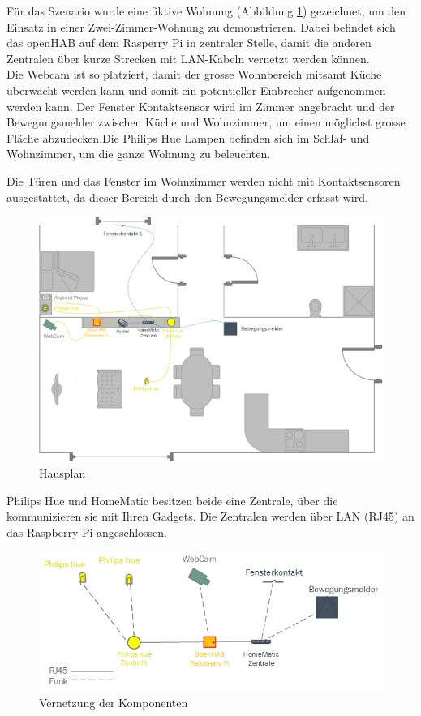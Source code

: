 Für das Szenario wurde eine fiktive Wohnung (Abbildung \ref{fig:housePlan}) gezeichnet, um den Einsatz in einer Zwei-Zimmer-Wohnung zu demonstrieren. Dabei befindet sich das openHAB auf dem Rasperry Pi in zentraler Stelle, damit die anderen Zentralen über kurze Strecken mit LAN-Kabeln vernetzt werden können.\\
Die Webcam ist so platziert, damit der grosse Wohnbereich mitsamt Küche überwacht werden kann und somit ein potentieller Einbrecher aufgenommen werden kann. Der Fenster Kontaktsensor wird im Zimmer angebracht und der Bewegungsmelder zwischen Küche und Wohnzimmer, um einen möglichst grosse Fläche abzudecken.Die Philips Hue Lampen befinden sich im Schlaf- und Wohnzimmer, um die ganze Wohnung zu beleuchten.

Die Türen und das Fenster im Wohnzimmer werden nicht mit Kontaktsensoren ausgestattet, da dieser Bereich durch den Bewegungsmelder erfasst wird.

\begin{figure}[H]
	\centering
		\includegraphics[scale=0.55]{report/img/hausplan_aktuell}
	\caption{Hausplan}
	\label{fig:housePlan}
\end{figure}

Philips Hue und HomeMatic besitzen beide eine Zentrale, über die kommunizieren sie mit Ihren Gadgets. Die Zentralen werden über LAN (RJ45) an das Raspberry Pi angeschlossen.

\begin{figure}[H]
	\centering
		\includegraphics[scale=1]{report/img/vernetzung}
	\caption{Vernetzung der Komponenten}
	\label{fig:componentsIntegration}
\end{figure}

